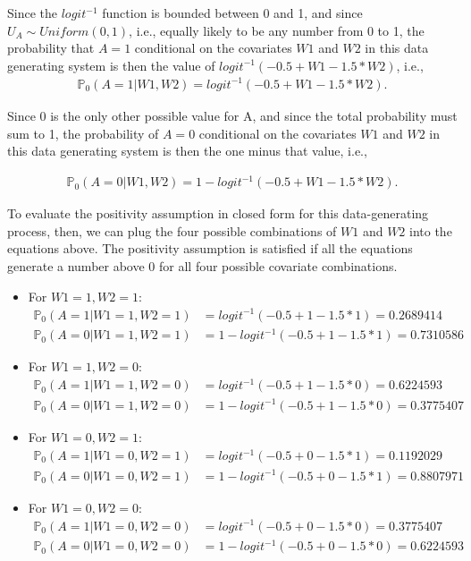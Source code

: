 \documentclass{article}\usepackage[]{graphicx}\usepackage[]{xcolor}
\begin{document}
Since the $logit^{-1}$ function is bounded between 0 and 1, and since $U_A \sim Uniform(0,1)$, i.e., equally likely to be any number from 0 to 1, the probability that $A=1$ conditional on the covariates $W1$ and $W2$ in this data generating system is then the value of $logit^{-1}(-0.5+W1-1.5*W2)$, i.e., 
\begin{align*}
\mathbb{P}_0(A=1|W1,W2)=logit^{-1}(-0.5+W1-1.5*W2).
\end{align*}

Since 0 is the only other possible value for A, and since the total probability must sum to 1, the probability of $A=0$ conditional on the covariates $W1$ and $W2$ in this data generating system is then the one minus that value, i.e.,

\begin{align*}
\mathbb{P}_0(A=0|W1,W2)=1-logit^{-1}(-0.5+W1-1.5*W2).
\end{align*}

To evaluate the positivity assumption in closed form for this data-generating process, then, we can plug the four possible combinations of $W1$ and $W2$ into the equations above. The positivity assumption is satisfied if all the equations generate a number above 0 for all four possible covariate combinations.

\begin{itemize}
  
  \item For $W1=1, W2=1$:
\begin{align*}
\mathbb{P}_0(A=1|W1=1,W2=1) &= logit^{-1}(-0.5+1-1.5*1) = 0.2689414 \\
\mathbb{P}_0(A=0|W1=1,W2=1) &= 1-logit^{-1}(-0.5+1-1.5*1) = 0.7310586
\end{align*}

  \item For $W1=1, W2=0$:
\begin{align*}
\mathbb{P}_0(A=1|W1=1,W2=0) &= logit^{-1}(-0.5+1-1.5*0) = 0.6224593 \\
\mathbb{P}_0(A=0|W1=1,W2=0) &= 1-logit^{-1}(-0.5+1-1.5*0) = 0.3775407
\end{align*}

  \item For $W1=0, W2=1$:
\begin{align*}
\mathbb{P}_0(A=1|W1=0,W2=1) &= logit^{-1}(-0.5+0-1.5*1) = 0.1192029 \\
\mathbb{P}_0(A=0|W1=0,W2=1) &= 1-logit^{-1}(-0.5+0-1.5*1) = 0.8807971
\end{align*}

  \item For $W1=0, W2=0$:
\begin{align*}
\mathbb{P}_0(A=1|W1=0,W2=0) &= logit^{-1}(-0.5+0-1.5*0) = 0.3775407 \\
\mathbb{P}_0(A=0|W1=0,W2=0) &= 1-logit^{-1}(-0.5+0-1.5*0) = 0.6224593 
\end{align*}
  
\end{itemize}
\end{document}
